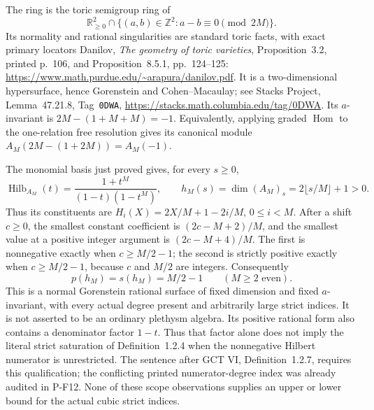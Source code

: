 \documentclass[11pt,a4paper]{article}
\begin{document}
The ring is the toric semigroup ring of
\[
 \mathbb R_{\ge0}^2\cap
   \{(a,b)\in\mathbb Z^2:a-b\equiv0\pmod {2M}\}.
\]
Its normality and rational singularities are standard toric
facts, with exact primary locators Danilov,
\emph{The geometry of toric varieties}, Proposition~3.2,
printed p.~106, and Proposition~8.5.1, pp.~124--125:
\url{https://www.math.purdue.edu/~arapura/danilov.pdf}.
It is a two-dimensional hypersurface, hence Gorenstein
and Cohen--Macaulay; see Stacks Project,
Lemma~47.21.8, Tag~\texttt{0DWA},
\url{https://stacks.math.columbia.edu/tag/0DWA}.
Its $a$-invariant is $2M-(1+M+M)=-1$.
Equivalently, applying graded $\operatorname{Hom}$ to the
one-relation free resolution gives its canonical module
$A_M(2M-(1+2M))=A_M(-1)$.

The monomial basis just proved gives, for every $s\ge0$,
\[
 \operatorname{Hilb}_{A_M}(t)
    =\frac{1+t^M}{(1-t)(1-t^M)},\qquad
 h_M(s)=\dim(A_M)_s=2\lfloor s/M\rfloor+1>0.              \tag{P-F54w}
\]
Thus its constituents are
$H_i(X)=2X/M+1-2i/M$, $0\le i<M$.
After a shift $c\ge0$, the smallest constant coefficient
is $(2c-M+2)/M$, and the smallest value at a positive
integer argument is $(2c-M+4)/M$.
The first is nonnegative exactly when $c\ge M/2-1$;
the second is strictly positive exactly when $c\ge M/2-1$,
because $c$ and $M/2$ are integers. Consequently
\[
             p(h_M)=s(h_M)=M/2-1 \qquad(M\ge2\text{ even}).
                                                               \tag{P-F54x}
\]
This is a normal Gorenstein rational surface of fixed
dimension and fixed $a$-invariant, with every actual degree
present and arbitrarily large strict indices. It is not
asserted to be an ordinary plethysm algebra.
Its positive rational form also contains a denominator
factor $1-t$. Thus that factor alone does not imply the
literal strict saturation of Definition~1.2.4 when the
nonnegative Hilbert numerator is unrestricted. The sentence
after GCT VI, Definition~1.2.7, requires this qualification;
the conflicting printed numerator-degree index was already
audited in P-F12. None of these scope observations supplies
an upper or lower bound for the actual cubic strict indices.
\end{document}
